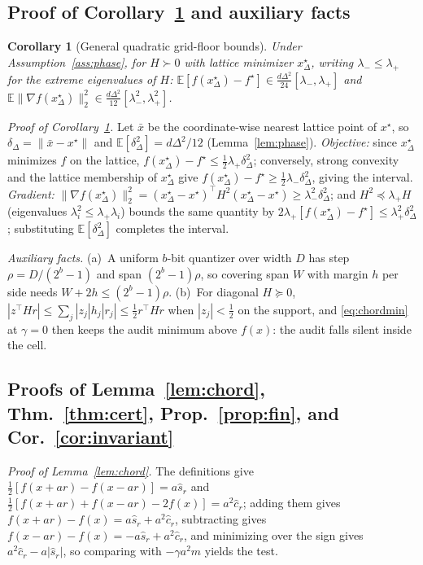 \documentclass{article}
\newtheorem{corollary}{Corollary}
\newcommand{\E}{\mathbb{E}}
\newcommand{\D}{\Delta}
\begin{document}
\subsection{Proof of Corollary~\ref{cor:gridfloor} and auxiliary facts}
\begin{corollary}[General quadratic grid-floor bounds]
\label{cor:gridfloor}
Under Assumption~\ref{ass:phase}, for $H\succ0$ with lattice minimizer $x_{\D}^\star$, writing $\lambda_{-}\le\lambda_{+}$ for the extreme eigenvalues of $H$: $\E[f(x_{\D}^\star)-f^\star]\in\frac{d\D^2}{24}[\lambda_{-},\lambda_{+}]$ and $\E\|\nabla f(x_{\D}^\star)\|_2^2\in\frac{d\D^2}{12}[\lambda_{-}^2,\lambda_{+}^2]$.
\end{corollary}
\emph{Proof of Corollary~\ref{cor:gridfloor}.} Let $\bar x$ be the coordinate-wise nearest lattice point of $x^\star$, so $\delta_{\D}=\|\bar x-x^\star\|$ and $\E[\delta_{\D}^2]=d\D^2/12$ (Lemma~\ref{lem:phase}). \emph{Objective:} since $x_{\D}^\star$ minimizes $f$ on the lattice, $f(x_{\D}^\star)-f^\star\le\frac12\lambda_+\delta_{\D}^2$; conversely, strong convexity and the lattice membership of $x_{\D}^\star$ give $f(x_{\D}^\star)-f^\star\ge\frac12\lambda_-\delta_{\D}^2$, giving the interval. \emph{Gradient:} $\|\nabla f(x_{\D}^\star)\|_2^2=(x_{\D}^\star-x^\star)^\top H^2(x_{\D}^\star-x^\star)\ge\lambda_-^2\delta_{\D}^2$; and $H^2\preceq\lambda_+H$ (eigenvalues $\lambda_i^2\le\lambda_+\lambda_i$) bounds the same quantity by $2\lambda_+[f(x_{\D}^\star)-f^\star]\le\lambda_+^2\delta_{\D}^2$; substituting $\E[\delta_{\D}^2]$ completes the interval.

\emph{Auxiliary facts.} (a)~A uniform $b$-bit quantizer over width $D$ has step $\rho=D/(2^b-1)$ and span $(2^b-1)\rho$, so covering span $W$ with margin $h$ per side needs $W+2h\le(2^b-1)\rho$. (b)~For diagonal $H\succeq0$, $|z^\top Hr|\le\sum_j|z_j|h_j|r_j|\le\frac12r^\top Hr$ when $|z_j|<\frac12$ on the support, and \eqref{eq:chordmin} at $\gamma=0$ then keeps the audit minimum above $f(x)$: the audit falls silent inside the cell.

\subsection{Proofs of Lemma~\ref{lem:chord}, Thm.~\ref{thm:cert}, Prop.~\ref{prop:fin}, and Cor.~\ref{cor:invariant}}
\emph{Proof of Lemma~\ref{lem:chord}.} The definitions give $\frac12[f(x+ar)-f(x-ar)]=a\widehat s_r$ and $\frac12[f(x+ar)+f(x-ar)-2f(x)]=a^2\widehat c_r$; adding them gives $f(x+ar)-f(x)=a\widehat s_r+a^2\widehat c_r$, subtracting gives $f(x-ar)-f(x)=-a\widehat s_r+a^2\widehat c_r$, and minimizing over the sign gives $a^2\widehat c_r-a|\widehat s_r|$, so comparing with $-\gamma a^2m$ yields the test.
\end{document}
